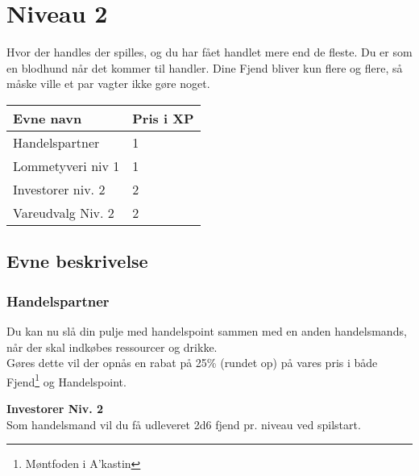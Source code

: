 \chapter*{Niveau 2}
Hvor der handles der spilles, og du har fået handlet mere end de fleste. Du er som en blodhund når det kommer til handler. Dine Fjend bliver kun flere og flere, så måske ville et par vagter ikke gøre noget.

\begin{table}[H]
    \centering
    \begin{tabular}{|p{}|p{}|}
    \rowcolor{cerulean!80}\hline
        Evne navn & Pris i XP \\\hline
         Handelspartner & 1 \\\hline
         Lommetyveri niv 1 & 1\\\hline
         Investorer niv. 2 & 2 \\\hline
         Vareudvalg Niv. 2 & 2 \\\hline
    \end{tabular}
\end{table}
\section*{Evne beskrivelse}

\subsection*{Handelspartner}
Du kan nu slå din pulje med handelspoint sammen med en anden handelsmands, når der skal indkøbes ressourcer og drikke.\\
Gøres dette vil der opnås en rabat på 25\% (rundet op) på vares pris i både Fjend\footnote{Møntfoden i A'kastin} og Handelspoint.



\textbf{Investorer Niv. 2}\\
Som handelsmand vil du få udleveret 2d6 fjend pr. niveau ved spilstart.
\\



